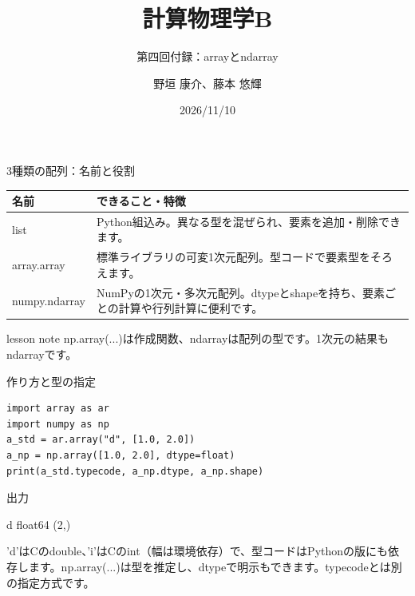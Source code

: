 \documentclass[12pt,aspectratio=43]{beamer}
\title[計算物理学B]{計算物理学B}
\subtitle[第四回付録]{第四回付録：arrayとndarray}
\author{野垣 康介、藤本 悠輝}
\date[2026/11/10]{2026/11/10}
\newcommand{\code}[1]{{\codefont #1}}
\newcommand{\out}[1]{%
  \par\vspace{.5mm}\noindent
  {\small\textcolor{black!60}{出力}}\hspace{1mm}%
  \begin{minipage}[t]{.88\linewidth}\vspace{0pt}%
    {\codefont\fontsize{11}{12.5}\selectfont #1}%
  \end{minipage}\par}
\newenvironment{lessonbox}
  {\begin{beamercolorbox}[wd=\linewidth,sep=1.5mm]{lesson note}}
  {\end{beamercolorbox}\par}
\begin{document}
\begin{frame}[t,noframenumbering]
  \titlepage
\end{frame}

\begin{frame}[t]{3種類の配列：名前と役割}
  \small
  \vspace{-1mm}
  \begingroup
    \renewcommand{\arraystretch}{1.12}
    \begin{tabular}{@{}p{3.3cm}p{6.6cm}@{}}
      \hline
      \textbf{名前} & \textbf{できること・特徴} \\
      \hline
      \code{list} &
        Python組込み。異なる型を混ぜられ、要素を追加・削除できます。 \\
      \code{array.array} &
        標準ライブラリの可変1次元配列。型コードで要素型をそろえます。 \\
      \mbox{\code{numpy.ndarray}} &
        NumPyの1次元・多次元配列。\code{dtype}と\code{shape}を持ち、要素ごとの計算や行列計算に便利です。 \\
      \hline
    \end{tabular}\par
  \endgroup
  \vspace{1mm}
  \begin{lessonbox}
    \code{np.array(...)}は作成関数、\code{ndarray}は配列の型です。1次元の結果も\code{ndarray}です。
  \end{lessonbox}
\end{frame}

\begin{frame}[t,fragile]{作り方と型の指定}
  \vspace{-1mm}
\begin{lstlisting}
import array as ar
import numpy as np
a_std = ar.array("d", [1.0, 2.0])
a_np = np.array([1.0, 2.0], dtype=float)
print(a_std.typecode, a_np.dtype, a_np.shape)
\end{lstlisting}
  \out{d float64 (2,)}
  \small \code{'d'}はCのdouble、\code{'i'}はCのint（幅は環境依存）で、型コードはPythonの版にも依存します。\code{np.array(...)}は型を推定し、\code{dtype}で明示もできます。\code{typecode}とは別の指定方式です。
\end{frame}
\end{document}

